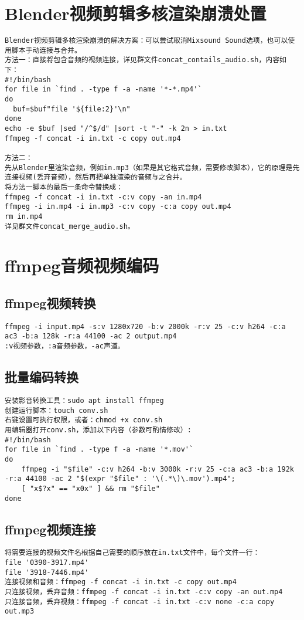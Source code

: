 \documentclass[a4paper,fontset=fandol,zihao=-4,linespread=1.2]{ctexbook}
\begin{document}
\section{Blender视频剪辑多核渲染崩溃处置}
\begin{lstlisting}
Blender视频剪辑多核渲染崩溃的解决方案：可以尝试取消Mixsound Sound选项，也可以使用脚本手动连接与合并。
方法一：直接将包含音频的视频连接，详见群文件concat_contails_audio.sh，内容如下：
#!/bin/bash
for file in `find . -type f -a -name '*-*.mp4'`
do
  buf=$buf"file '${file:2}'\n"
done
echo -e $buf |sed "/^$/d" |sort -t "-" -k 2n > in.txt
ffmpeg -f concat -i in.txt -c copy out.mp4

方法二：
先从Blender里渲染音频，例如in.mp3（如果是其它格式音频，需要修改脚本），它的原理是先连接视频(丢弃音频），然后再把单独渲染的音频与之合并。
将方法一脚本的最后一条命令替换成：
ffmpeg -f concat -i in.txt -c:v copy -an in.mp4
ffmpeg -i in.mp4 -i in.mp3 -c:v copy -c:a copy out.mp4
rm in.mp4
详见群文件concat_merge_audio.sh。
\end{lstlisting}

\section{ffmpeg音频视频编码}

\subsection{ffmpeg视频转换}
\begin{lstlisting}
ffmpeg -i input.mp4 -s:v 1280x720 -b:v 2000k -r:v 25 -c:v h264 -c:a ac3 -b:a 128k -r:a 44100 -ac 2 output.mp4
:v视频参数，:a音频参数，-ac声道。
\end{lstlisting}

\subsection{批量编码转换}
\begin{lstlisting}
安装影音转换工具：sudo apt install ffmpeg
创建运行脚本：touch conv.sh
右键设置可执行权限，或者：chmod +x conv.sh
用编辑器打开conv.sh，添加以下内容（参数可酌情修改）:
#!/bin/bash
for file in `find . -type f -a -name '*.mov'`
do
    ffmpeg -i "$file" -c:v h264 -b:v 3000k -r:v 25 -c:a ac3 -b:a 192k -r:a 44100 -ac 2 "$(expr "$file" : '\(.*\)\.mov').mp4";
    [ "x$?x" == "x0x" ] && rm "$file"
done
\end{lstlisting}

\subsection{ffmpeg视频连接}
\begin{lstlisting}
将需要连接的视频文件名根据自己需要的顺序放在in.txt文件中，每个文件一行：
file '0390-3917.mp4'
file '3918-7446.mp4'
连接视频和音频：ffmpeg -f concat -i in.txt -c copy out.mp4
只连接视频，丢弃音频：ffmpeg -f concat -i in.txt -c:v copy -an out.mp4
只连接音频，丢弃视频：ffmpeg -f concat -i in.txt -c:v none -c:a copy out.mp3
\end{lstlisting}
\end{document}
